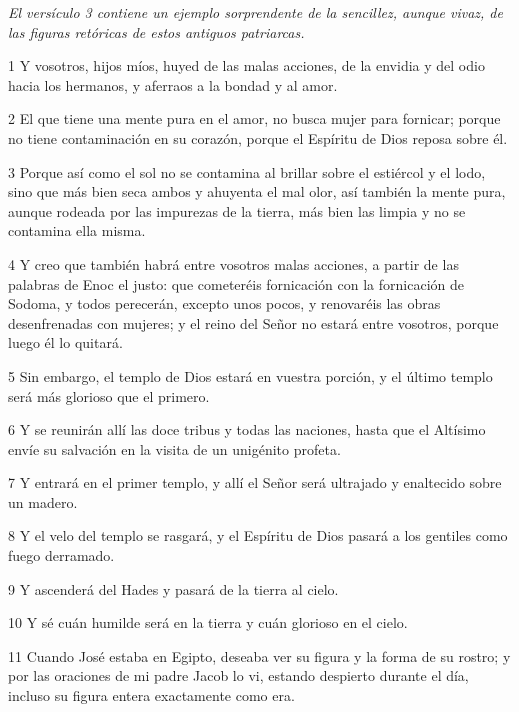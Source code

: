 \par \textit{El versículo 3 contiene un ejemplo sorprendente de la sencillez, aunque vivaz, de las figuras retóricas de estos antiguos patriarcas.}

\par 1 Y vosotros, hijos míos, huyed de las malas acciones, de la envidia y del odio hacia los hermanos, y aferraos a la bondad y al amor.

\par 2 El que tiene una mente pura en el amor, no busca mujer para fornicar; porque no tiene contaminación en su corazón, porque el Espíritu de Dios reposa sobre él.

\par 3 Porque así como el sol no se contamina al brillar sobre el estiércol y el lodo, sino que más bien seca ambos y ahuyenta el mal olor, así también la mente pura, aunque rodeada por las impurezas de la tierra, más bien las limpia y no se contamina ella misma.

\par 4 Y creo que también habrá entre vosotros malas acciones, a partir de las palabras de Enoc el justo: que cometeréis fornicación con la fornicación de Sodoma, y ​​todos perecerán, excepto unos pocos, y renovaréis las obras desenfrenadas con mujeres; y el reino del Señor no estará entre vosotros, porque luego él lo quitará.

\par 5 Sin embargo, el templo de Dios estará en vuestra porción, y el último templo será más glorioso que el primero.

\par 6 Y se reunirán allí las doce tribus y todas las naciones, hasta que el Altísimo envíe su salvación en la visita de un unigénito profeta.

\par 7 Y entrará en el primer templo, y allí el Señor será ultrajado y enaltecido sobre un madero.

\par 8 Y el velo del templo se rasgará, y el Espíritu de Dios pasará a los gentiles como fuego derramado.

\par 9 Y ascenderá del Hades y pasará de la tierra al cielo.

\par 10 Y sé cuán humilde será en la tierra y cuán glorioso en el cielo.

\par 11 Cuando José estaba en Egipto, deseaba ver su figura y la forma de su rostro; y por las oraciones de mi padre Jacob lo vi, estando despierto durante el día, incluso su figura entera exactamente como era.

